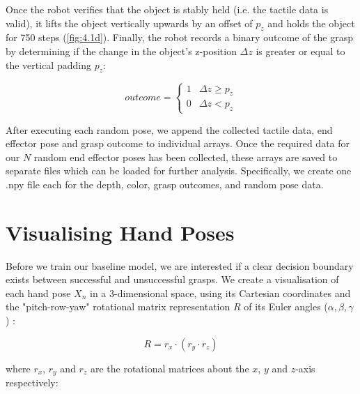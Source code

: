 \documentclass[12pt, a4paper]{report}
\theoremstyle{definition}
\begin{document}
Once the robot verifies that the object is stably held (i.e. the tactile data is valid), it lifts the object vertically upwards by an offset of $p_z$ and holds the object for 750 steps (\ref{fig:4.1d}). Finally, the robot records a binary outcome of the grasp by determining if the change in the object's z-position $\Delta z$ is greater or equal to the vertical padding $p_z$:

\begin{equation}
    outcome=\begin{cases}1 & \Delta z\geq p_z \\ 0 & \Delta z<p_z\end{cases}
\end{equation}

After executing each random pose, we append the collected tactile data, end effector pose and grasp outcome to individual arrays. Once the required data for our $N$ random end effector poses has been collected, these arrays are saved to separate files which can be loaded for further analysis. Specifically, we create one .npy file each for the depth, color, grasp outcomes, and random pose data.

\newpage
\section{Visualising Hand Poses}
\label{sec:4.2}
Before we train our baseline model, we are interested if a clear decision boundary exists between successful and unsuccessful grasps. We create a visualisation of each hand pose $X_n$ in a 3-dimensional space, using its Cartesian coordinates and the "pitch-row-yaw" rotational matrix representation $R$ of its Euler angles ($\alpha,\beta,\gamma$) \cite{euleranglewolfram}:

\begin{equation}
    R=r_x\cdot(r_y\cdot r_z)
\end{equation}

\noindent where $r_x$, $r_y$ and $r_z$ are the rotational matrices about the $x$, $y$ and $z$-axis respectively:
\end{document}
